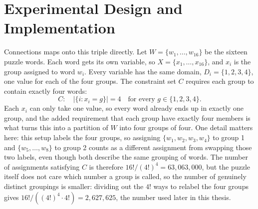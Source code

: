 \chapter{Experimental Design and Implementation}
\label{ch:toolsupport}




Connections maps onto this triple directly. Let $W = \{w_1, \dots, w_{16}\}$ be the sixteen puzzle words. Each word gets its own variable, so $X = \{x_1, \dots, x_{16}\}$, and $x_i$ is the group assigned to word $w_i$. Every variable has the same domain, $D_i = \{1, 2, 3, 4\}$, one value for each of the four groups. The constraint set $C$ requires each group to contain exactly four words:
\begin{equation}
C: \quad |\{i : x_i = g\}| = 4 \quad \text{for every } g \in \{1,2,3,4\}.
\label{eq:csp-constraint}
\end{equation}
Each $x_i$ can only take one value, so every word already ends up in exactly one group, and the added requirement that each group have exactly four members is what turns this into a partition of $W$ into four groups of four. One detail matters here: this setup labels the four groups, so assigning $\{w_1,w_2,w_3,w_4\}$ to group 1 and $\{w_5,\dots,w_8\}$ to group 2 counts as a different assignment from swapping those two labels, even though both describe the same grouping of words. The number of assignments satisfying $C$ is therefore $16!/(4!)^4 = 63{,}063{,}000$, but the puzzle itself does not care which number a group is called, so the number of genuinely distinct groupings is smaller: dividing out the $4!$ ways to relabel the four groups gives $16!/((4!)^4 \cdot 4!) = 2{,}627{,}625$, the number used later in this thesis.
